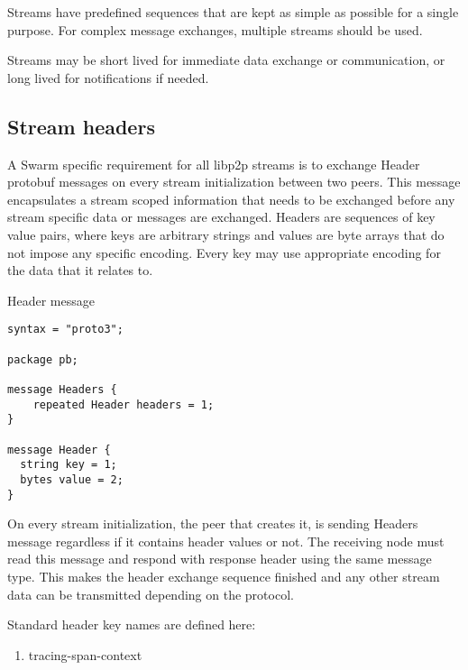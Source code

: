 Streams have predefined sequences that are kept as simple as possible for a single purpose. For complex message exchanges, multiple streams should be used.

Streams may be short lived for immediate data exchange or communication, or long lived for notifications if needed.

\subsection{Stream headers}

A Swarm specific requirement for all libp2p streams is to exchange Header protobuf messages on every stream initialization between two peers. This message encapsulates a stream scoped information that needs to be exchanged before any stream specific data or messages are exchanged. Headers are sequences of key value pairs, where keys are arbitrary strings and values are byte arrays that do not impose any specific encoding. Every key may use appropriate encoding for the data that it relates to.

\begin{definition}{Header message}\label{def:headers-message}

\begin{lstlisting}[language=protobuf3]
syntax = "proto3";

package pb;

message Headers {
    repeated Header headers = 1;
}

message Header {
  string key = 1;
  bytes value = 2;
}
\end{lstlisting}
\end{definition}

On every stream initialization, the peer that creates it, is sending Headers message regardless if it contains header values or not. The receiving node must read this message and respond with response header using the same message type. This makes the header exchange sequence finished and any other stream data can be transmitted depending on the protocol.

Standard header key names are defined here:

\begin{enumerate}
\item tracing-span-context
\end{enumerate}